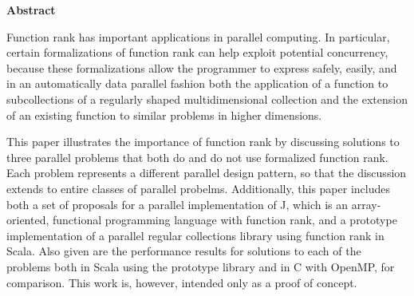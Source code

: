 \begin{center}

\bigskip

\begin{Large}
\textbf{\theTitle}
\end{Large}

\bigskip

\begin{large}
\theAuthor
\end{large}

\bigskip
\bigskip

\textbf{Abstract}

\end{center}

\noindent
Function rank has important applications in parallel computing.
In particular, certain formalizations of function rank can help exploit potential concurrency, 
because these formalizations allow the programmer to express 
safely, easily, and in an automatically data parallel fashion  
both the application of a function to subcollections of a regularly shaped multidimensional collection and 
the extension of an existing function to similar problems in higher dimensions.

This paper illustrates the importance of function rank 
by discussing solutions to three parallel problems that both do and do not use formalized function rank. 
Each problem represents a different parallel design pattern, 
so that the discussion extends to entire classes of parallel probelms. 
Additionally, this paper includes both a set of proposals for a parallel implementation of J, 
which is an array-oriented, functional programming language with function rank, 
and a prototype implementation of a parallel regular collections library using function rank in Scala. 
Also given are the performance results for solutions to each of the problems 
both in Scala using the prototype library and in C with OpenMP, for comparison.
This work is, however, intended only as a proof of concept.
